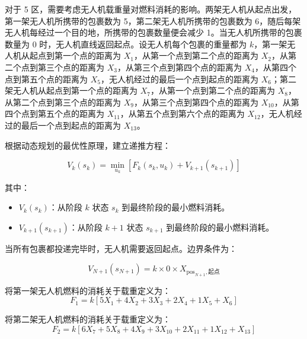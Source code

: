 \documentclass[a4paper]{article} %
\begin{document}
{对于 5 区，需要考虑无人机载重量对燃料消耗的影响。两架无人机从起点出发，第一架无人机所携带的包裹数为 5，第二架无人机所携带的包裹数为 6，随后每架无人机每经过一个目的地，所携带的包裹数量便会减少 1。当无人机所携带的包裹数量为 0 时，无人机直线返回起点。设无人机每个包裹的重量都为 \( k \)，第一架无人机从起点到第一个点的距离为 \( X_1 \)，从第一个点到第二个点的距离为 \( X_2 \)，从第二个点到第三个点的距离为 \( X_3 \)，从第三个点到第四个点的距离为 \( X_4 \)，从第四个点到第五个点的距离为 \( X_5 \)，无人机经过的最后一个点到起点的距离为 \( X_6 \)；第二架无人机从起点到第一个点的距离为 \( X_7 \)，从第一个点到第二个点的距离为 \( X_8 \)，从第二个点到第三个点的距离为 \( X_9 \)，从第三个点到第四个点的距离为 \( X_{10} \)，从第四个点到第五个点的距离为 \( X_{11} \)，从第五个点到第六个点的距离为 \( X_{12} \)，无人机经过的最后一个点到起点的距离为 \( X_{13} \)。

根据动态规划的最优性原理，建立递推方程：

\begin{equation}
V_{k}(s_{k}) = \min_{u_{k}} \left[ F_{k}(s_{k}, u_{k}) + V_{k+1}(s_{k+1}) \right]
\end{equation}

其中：
\begin{itemize}
    \item \( V_{k}(s_{k}) \)：从阶段 \( k \) 状态 \( s_{k} \) 到最终阶段的最小燃料消耗。
    \item \( V_{k+1}(s_{k+1}) \)：从阶段 \( k+1 \) 状态 \( s_{k+1} \) 到最终阶段的最小燃料消耗。
\end{itemize}

当所有包裹都投递完毕时，无人机需要返回起点。边界条件为：

\begin{equation}
V_{N+1}(s_{N+1}) = k \times 0 \times X_{\text{pos}_{N+1}, \text{起点}}
\end{equation}


将第一架无人机燃料的消耗关于载重定义为：
\begin{equation}
F_1 = k \left[ 5 X_1 + 4 X_2 + 3 X_3 + 2 X_4 + 1 X_5 + X_6 \right]
\end{equation}

将第二架无人机燃料的消耗关于载重定义为：
\begin{equation}
F_2 = k \left[ 6 X_7 + 5 X_8 + 4 X_9 + 3 X_{10} + 2 X_{11} + 1 X_{12} + X_{13} \right]
\end{equation}

}
\end{document}
